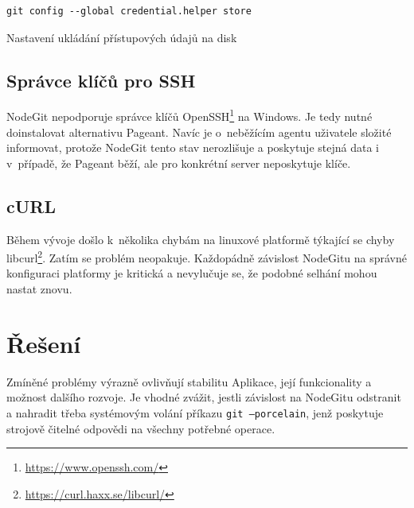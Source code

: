 \FloatBarrier
\begin{listing}[ht]
	\begin{verbatim}
git config --global credential.helper store
	\end{verbatim}
	\caption{Nastavení ukládání přístupových údajů na disk}
\end{listing}
\FloatBarrier

\subsection{Správce klíčů pro SSH}

NodeGit nepodporuje správce klíčů OpenSSH\footnote{\url{https://www.openssh.com/}} na Windows. Je tedy nutné doinstalovat alternativu Pageant. Navíc je o~neběžícím agentu uživatele složité informovat, protože NodeGit tento stav nerozlišuje a poskytuje stejná data i v~případě, že Pageant běží, ale pro konkrétní server neposkytuje klíče.

\subsection{cURL}

Během vývoje došlo k~několika chybám na linuxové platformě týkající se chyby libcurl\footnote{\url{https://curl.haxx.se/libcurl/}}. Zatím se problém neopakuje. Každopádně závislost NodeGitu na správné konfiguraci platformy je kritická a nevylučuje se, že podobné selhání mohou nastat znovu.

\section{Řešení}

Zmíněné problémy výrazně ovlivňují stabilitu Aplikace, její funkcionality a možnost dalšího rozvoje. Je vhodné zvážit, jestli závislost na NodeGitu odstranit a nahradit třeba systémovým volání příkazu \texttt{git --porcelain}, jenž poskytuje strojově čitelné odpovědi na všechny potřebné operace.
